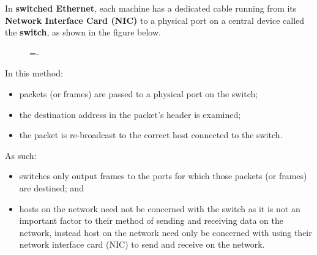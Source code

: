 \documentclass[a4paper]{systems-software}
\begin{document}
In \textbf{switched Ethernet}, each machine has a dedicated cable running from its \textbf{Network Interface Card (NIC)} to a physical port on a central device called the \textbf{switch}, as shown in the figure below.

\begin{figure}[H]
	\lineskip=-\fboxrule
\end{figure}

In this method:
\begin{itemize}
	\item packets (or frames) are passed to a physical port on the switch;
	\item the destination address in the packet’s header is examined;
	\item the packet is re-broadcast to the correct host connected to the switch.
\end{itemize}

As such:
\begin{itemize}
	\item switches only output frames to the ports for which those packets (or frames) are destined; and
	\item hosts on the network need not be concerned with the switch as it is not an important factor to their method of sending and receiving data on the network, instead host on the network need only be concerned with using their network interface card (NIC) to send and receive on the network.
\end{itemize}
\end{document}
